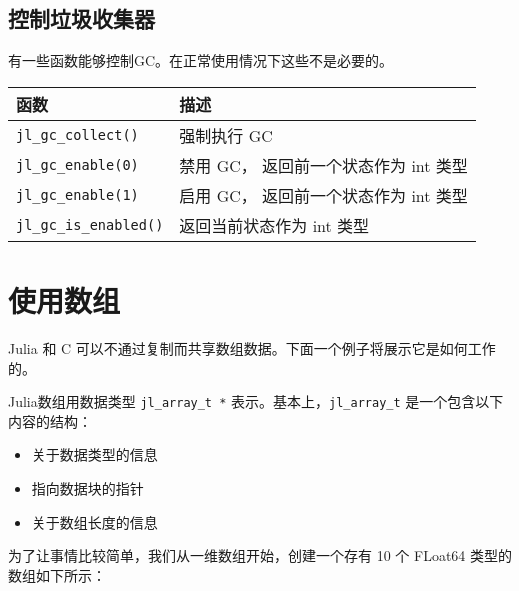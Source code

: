 \subsection{控制垃圾收集器}



有一些函数能够控制GC。在正常使用情况下这些不是必要的。




\begin{table}[h]

\begin{tabulary}{\linewidth}{|L|L|}
\hline
函数 & 描述 \\
\hline
\texttt{jl\_gc\_collect()} & 强制执行 GC \\
\hline
\texttt{jl\_gc\_enable(0)} & 禁用 GC， 返回前一个状态作为 int 类型 \\
\hline
\texttt{jl\_gc\_enable(1)} & 启用 GC， 返回前一个状态作为 int 类型 \\
\hline
\texttt{jl\_gc\_is\_enabled()} & 返回当前状态作为 int 类型 \\
\hline
\end{tabulary}

\end{table}



\hypertarget{12793375650632651595}{}


\section{使用数组}



Julia 和 C 可以不通过复制而共享数组数据。下面一个例子将展示它是如何工作的。



Julia数组用数据类型 \texttt{jl\_array\_t *} 表示。基本上，\texttt{jl\_array\_t} 是一个包含以下内容的结构：



\begin{itemize}
\item 关于数据类型的信息


\item 指向数据块的指针


\item 关于数组长度的信息

\end{itemize}


为了让事情比较简单，我们从一维数组开始，创建一个存有 10 个 FLoat64 类型的数组如下所示：




